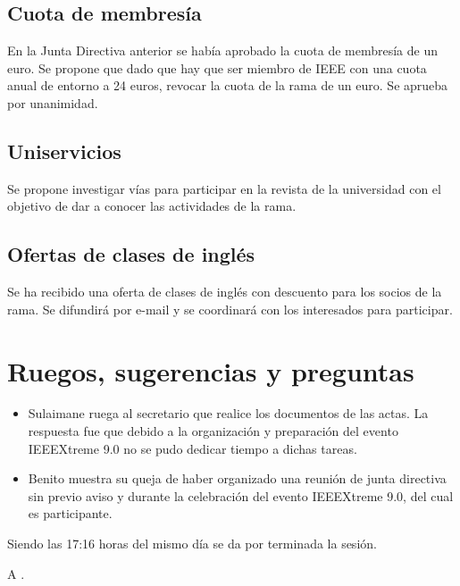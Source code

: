 \documentclass[12pt,twoside,openany,a4paper]{book}
\begin{document}
    \subsection{Cuota de membresía}
    En la Junta Directiva anterior se había aprobado la cuota de membresía de un euro. Se propone que dado que hay que ser miembro de IEEE con una cuota anual de entorno a 24 euros, revocar la cuota de la rama de un euro. Se aprueba por unanimidad.

    \subsection{Uniservicios}
    Se propone investigar vías para participar en la revista de la universidad con el objetivo de dar a conocer las actividades de la rama.

    \subsection{Ofertas de clases de inglés}
    Se ha recibido una oferta de clases de inglés con descuento para los socios de la rama. Se difundirá por e-mail y se coordinará con los interesados para participar.

    \section{Ruegos, sugerencias y preguntas}
    \begin{itemize}
        \item Sulaimane ruega al secretario que realice los documentos de las actas. La respuesta fue que debido a la organización y preparación del evento IEEEXtreme 9.0 no se pudo dedicar tiempo a dichas tareas.

        \item Benito muestra su queja de haber organizado una reunión de junta directiva sin previo aviso y durante la celebración del evento IEEEXtreme 9.0, del cual es participante.
    \end{itemize}


    \clearpage
    Siendo las 17:16 horas del mismo día se da por terminada la sesión.

    A \Date.
    \vspace{10mm}
\end{document}
